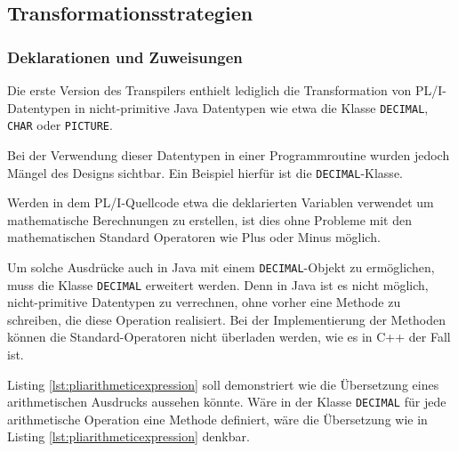 \subsection{Transformationsstrategien}
\subsubsection{Deklarationen und Zuweisungen}
Die erste Version des Transpilers enthielt lediglich die Transformation von PL/I-Datentypen in nicht-primitive Java Datentypen wie etwa die Klasse \verb+DECIMAL+, \verb+CHAR+ oder \verb+PICTURE+.


Bei der Verwendung dieser Datentypen in einer Programmroutine wurden jedoch Mängel des Designs sichtbar. Ein Beispiel hierfür ist die \verb+DECIMAL+-Klasse.

Werden in dem PL/I-Quellcode etwa die deklarierten Variablen verwendet um mathematische Berechnungen zu erstellen, ist dies ohne Probleme mit den mathematischen Standard Operatoren wie Plus oder Minus möglich.

Um solche Ausdrücke auch in Java mit einem \verb+DECIMAL+-Objekt zu ermöglichen, muss die Klasse \verb+DECIMAL+ erweitert werden.
Denn in Java ist es nicht möglich, nicht-primitive Datentypen zu verrechnen, ohne vorher eine Methode zu schreiben, die diese Operation realisiert. 
Bei der Implementierung der Methoden können die Standard-Operatoren nicht überladen werden, wie es in C++ der Fall ist.

Listing \ref{lst:pliarithmeticexpression} soll demonstriert wie die Übersetzung eines arithmetischen Ausdrucks aussehen könnte.
Wäre in der Klasse \verb+DECIMAL+ für jede arithmetische Operation eine Methode definiert, wäre die Übersetzung wie in Listing \ref{lst:pliarithmeticexpression} denkbar.

